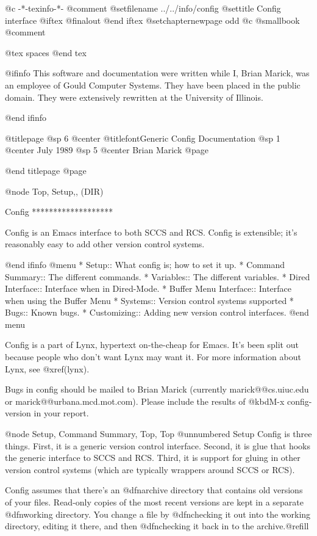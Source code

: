  @c -*-texinfo-*-
@comment %
@setfilename ../../info/config
@settitle Config interface
@iftex
@finalout
@end iftex
@setchapternewpage odd
@c      @smallbook
@comment %

@tex
\overfullrule=0pt %
spaces
@end tex

@ifinfo
This software and documentation were written while I, Brian Marick,
was an employee of Gould Computer Systems.  They have been placed in
the public domain. They were extensively rewritten at the University
of Illinois.

@end ifinfo

@titlepage
@sp 6
@center @titlefont{Generic Config Documentation}
@sp 1
@center July 1989
@sp 5
@center Brian Marick
@page

@end titlepage
@page

@node Top, Setup,, (DIR)

Config *******************

Config is an Emacs interface to both SCCS and RCS.  Config is
extensible; it's reasonably easy to add other version control systems.

@end ifinfo
@menu
* Setup::			What config is; how to set it up.
* Command Summary::		The different commands.
* Variables::			The different variables.
* Dired Interface::		Interface when in Dired-Mode.
* Buffer Menu Interface::	Interface when using the Buffer Menu
* Systems::			Version control systems supported
* Bugs::			Known bugs.
* Customizing::			Adding new version control interfaces.
@end menu

Config is a part of Lynx, hypertext on-the-cheap for Emacs.  It's been
split out because people who don't want Lynx may want it.  For more
information about Lynx, see @xref{(lynx)}.

Bugs in config should be mailed to Brian Marick (currently
marick@@cs.uiuc.edu or marick@@urbana.mcd.mot.com).  Please include
the results of @kbd{M-x config-version} in your report.

@node Setup, Command Summary, Top, Top
@unnumbered Setup
Config is three things.  First, it is a generic version control
interface.  Second, it is glue that hooks the generic interface to
SCCS and RCS.  Third, it is support for gluing in other version
control systems (which are typically wrappers around SCCS or RCS).

Config assumes that there's an @dfn{archive directory} that contains
old versions of your files.  Read-only copies of the most recent
versions are kept in a separate @dfn{working directory}.  You change a
file by @dfn{checking it out} into the working directory, editing it
there, and then @dfn{checking it back in} to the archive.@refill

